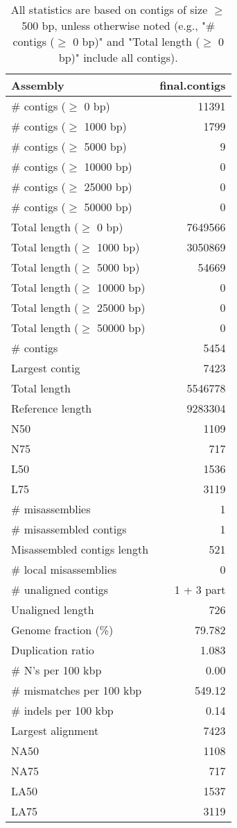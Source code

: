 \documentclass[12pt,a4paper]{article}
\begin{document}
\begin{table}[ht]
\begin{center}
\caption{All statistics are based on contigs of size $\geq$ 500 bp, unless otherwise noted (e.g., "\# contigs ($\geq$ 0 bp)" and "Total length ($\geq$ 0 bp)" include all contigs).}
\begin{tabular}{|l*{1}{|r}|}
\hline
Assembly & final.contigs \\ \hline
\# contigs ($\geq$ 0 bp) & 11391 \\ \hline
\# contigs ($\geq$ 1000 bp) & 1799 \\ \hline
\# contigs ($\geq$ 5000 bp) & 9 \\ \hline
\# contigs ($\geq$ 10000 bp) & 0 \\ \hline
\# contigs ($\geq$ 25000 bp) & 0 \\ \hline
\# contigs ($\geq$ 50000 bp) & 0 \\ \hline
Total length ($\geq$ 0 bp) & 7649566 \\ \hline
Total length ($\geq$ 1000 bp) & 3050869 \\ \hline
Total length ($\geq$ 5000 bp) & 54669 \\ \hline
Total length ($\geq$ 10000 bp) & 0 \\ \hline
Total length ($\geq$ 25000 bp) & 0 \\ \hline
Total length ($\geq$ 50000 bp) & 0 \\ \hline
\# contigs & 5454 \\ \hline
Largest contig & 7423 \\ \hline
Total length & 5546778 \\ \hline
Reference length & 9283304 \\ \hline
N50 & 1109 \\ \hline
N75 & 717 \\ \hline
L50 & 1536 \\ \hline
L75 & 3119 \\ \hline
\# misassemblies & 1 \\ \hline
\# misassembled contigs & 1 \\ \hline
Misassembled contigs length & 521 \\ \hline
\# local misassemblies & 0 \\ \hline
\# unaligned contigs & 1 + 3 part \\ \hline
Unaligned length & 726 \\ \hline
Genome fraction (\%) & 79.782 \\ \hline
Duplication ratio & 1.083 \\ \hline
\# N's per 100 kbp & 0.00 \\ \hline
\# mismatches per 100 kbp & 549.12 \\ \hline
\# indels per 100 kbp & 0.14 \\ \hline
Largest alignment & 7423 \\ \hline
NA50 & 1108 \\ \hline
NA75 & 717 \\ \hline
LA50 & 1537 \\ \hline
LA75 & 3119 \\ \hline
\end{tabular}
\end{center}
\end{table}
\end{document}
